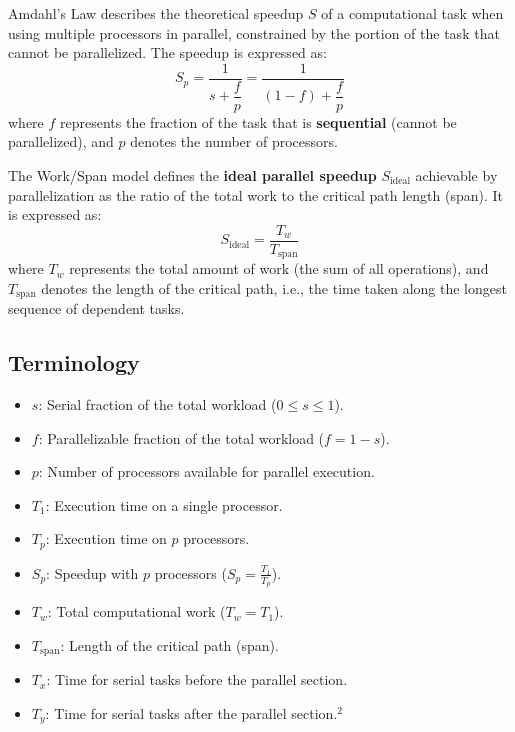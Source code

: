 \documentclass[
  a4paper, %
]{kaohandt}
\begin{document}
\begin{definition}
  Amdahl's Law describes the theoretical speedup $S$ of a computational task when using multiple processors in parallel, constrained by the portion of the task that cannot be parallelized. The speedup is expressed as:
  \begin{equation}
    S_p = \frac{1}{s + \dfrac{f}{p}} = \frac{1}{(1 - f) + \dfrac{f}{p}}
  \end{equation}
  where $f$ represents the fraction of the task that is \textbf{sequential} (cannot be parallelized), and $p$ denotes the number of processors.
\end{definition}

\pagebreak

\begin{definition}
  The Work/Span model defines the \textbf{ideal parallel speedup} $S_{\text{ideal}}$ achievable by parallelization as the ratio of the total work to the critical path length (span). It is expressed as:
  \begin{equation}
    S_{\text{ideal}} = \frac{T_w}{T_{\text{span}}}
  \end{equation}
  where $T_w$ represents the total amount of work (the sum of all operations), and $T_{\text{span}}$ denotes the length of the critical path, i.e., the time taken along the longest sequence of dependent tasks.
\end{definition}

\subsection{Terminology}

\begin{itemize}
  \item $s$: Serial fraction of the total workload ($0 \leq s \leq 1$).
  \item $f$: Parallelizable fraction of the total workload ($f=1-s$).
  \item $p$: Number of processors available for parallel execution.
  \item $T_1$: Execution time on a single processor.
  \item $T_p$: Execution time on $p$ processors.
  \item $S_p$: Speedup with $p$ processors ($S_p = \frac{T_1}{T_p}$).
  \item $T_w$: Total computational work ($T_w = T_1$).
  \item $T_{\text{span}}$: Length of the critical path (span).
  \item $T_x$: Time for serial tasks before the parallel section.
  \item $T_y$: Time for serial tasks after the parallel section.$^{2}$
\end{itemize}
\end{document}
